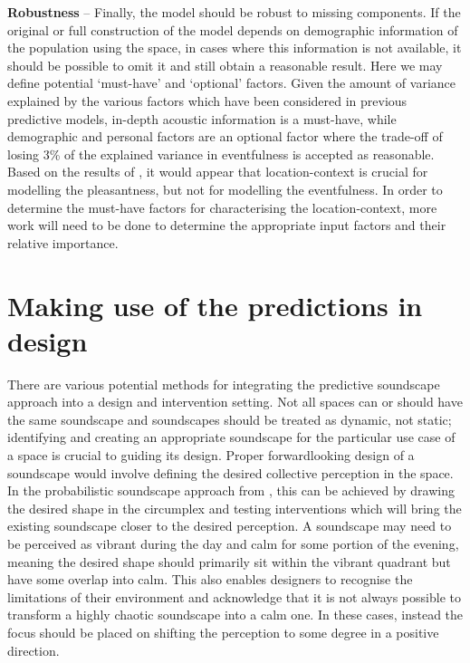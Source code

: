 \documentclass[
  authoryear,
  preprint,
  1p]{elsarticle}
\begin{document}
\textbf{Robustness} -- Finally, the model should be robust to missing
components. If the original or full construction of the model depends on
demographic information of the population using the space, in cases
where this information is not available, it should be possible to omit
it and still obtain a reasonable result. Here we may define potential
`must-have' and `optional' factors. Given the amount of variance
explained by the various factors which have been considered in previous
predictive models, in-depth acoustic information is a must-have, while
demographic and personal factors are an optional factor where the
trade-off of losing 3\% of the explained variance in eventfulness
\citep{Erfanian2021Psychological} is accepted as reasonable. Based on
the results of \citet{Mitchell2021Investigating}, it would appear that
location-context is crucial for modelling the pleasantness, but not for
modelling the eventfulness. In order to determine the must-have factors
for characterising the location-context, more work will need to be done
to determine the appropriate input factors and their relative
importance.

\hypertarget{making-use-of-the-predictions-in-design}{%
\section{Making use of the predictions in
design}\label{making-use-of-the-predictions-in-design}}

There are various potential methods for integrating the predictive
soundscape approach into a design and intervention setting. Not all
spaces can or should have the same soundscape and soundscapes should be
treated as dynamic, not static; identifying and creating an appropriate
soundscape for the particular use case of a space is crucial to guiding
its design. Proper forwardlooking design of a soundscape would involve
defining the desired collective perception in the space. In the
probabilistic soundscape approach from \citet{Mitchell2022How}, this can
be achieved by drawing the desired shape in the circumplex and testing
interventions which will bring the existing soundscape closer to the
desired perception. A soundscape may need to be perceived as vibrant
during the day and calm for some portion of the evening, meaning the
desired shape should primarily sit within the vibrant quadrant but have
some overlap into calm. This also enables designers to recognise the
limitations of their environment and acknowledge that it is not always
possible to transform a highly chaotic soundscape into a calm one. In
these cases, instead the focus should be placed on shifting the
perception to some degree in a positive direction.
\end{document}
